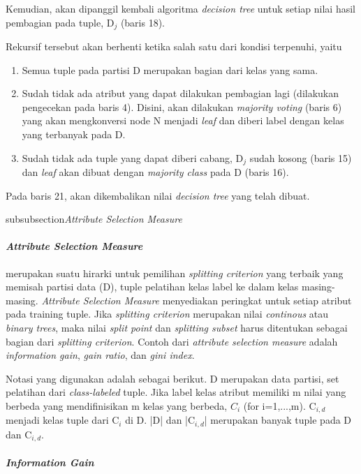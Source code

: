Kemudian, akan dipanggil kembali algoritma \textsl{decision tree} untuk setiap nilai hasil pembagian pada tuple, D$_{j}$  (baris 18).

Rekursif tersebut akan berhenti ketika salah satu dari kondisi terpenuhi, yaitu

\begin{enumerate}
	\item Semua tuple pada partisi D merupakan bagian dari kelas yang sama.
	\item Sudah tidak ada atribut yang dapat dilakukan pembagian lagi (dilakukan pengecekan pada baris 4). Disini, akan dilakukan \textsl{majority voting} (baris 6) yang akan mengkonversi node N menjadi \textsl{leaf} dan diberi label dengan kelas yang terbanyak pada D.
	\item Sudah tidak ada tuple yang dapat diberi cabang, D$_{j}$ sudah kosong (baris 15) dan \textsl{leaf} akan dibuat dengan \textsl{majority class} pada D (baris 16).
\end{enumerate}

Pada baris 21, akan dikembalikan nilai \textsl{decision tree} yang telah dibuat.

subsubsection{\textsl{Attribute Selection Measure}}

\paragraph{\textsl{Attribute Selection Measure}} merupakan suatu hirarki untuk pemilihan \textsl{splitting criterion} yang terbaik yang memisah partisi data (D), tuple pelatihan kelas label ke dalam kelas masing-masing. \textsl{Attribute Selection Measure} menyediakan peringkat untuk setiap atribut pada training tuple. Jika \textsl{splitting criterion} merupakan nilai \textsl{continous} atau \textsl{binary trees}, maka nilai \textsl{split point} dan \textsl{splitting subset} harus ditentukan sebagai bagian dari \textsl{splitting criterion}. Contoh dari \textsl{attribute selection measure} adalah \textsl{information gain}, \textsl{gain ratio}, dan \textsl{gini index}.

Notasi yang digunakan adalah sebagai berikut. D merupakan data partisi, set pelatihan dari \textsl{class-labeled} tuple. Jika label kelas atribut memiliki m nilai yang berbeda yang mendifinisikan m kelas yang berbeda, $C_{i}$ (for i=1,...,m). C$_{i,d}$ menjadi kelas tuple dari C$_{i}$ di D. |D| dan |C$_{i,d}$| merupakan banyak tuple pada D dan C$_{i,d}$.

\paragraph{\textsl{Information Gain}}


